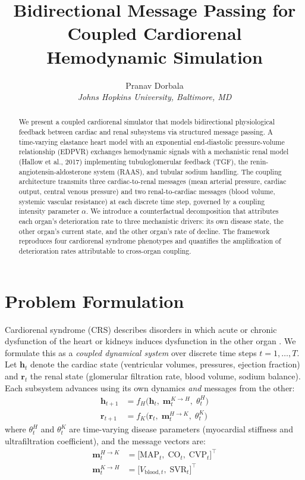 \documentclass[10pt,twocolumn]{article}
\title{\Large\bfseries Bidirectional Message Passing for Coupled Cardiorenal Hemodynamic Simulation}
\author{Pranav Dorbala\\
\normalsize\itshape Johns Hopkins University, Baltimore, MD}
\date{}
\begin{document}
\maketitle

\begin{abstract}
\noindent We present a coupled cardiorenal simulator that models bidirectional physiological feedback between cardiac and renal subsystems via structured message passing. A time-varying elastance heart model with an exponential end-diastolic pressure-volume relationship (EDPVR) exchanges hemodynamic signals with a mechanistic renal model (Hallow et al., 2017) implementing tubuloglomerular feedback (TGF), the renin-angiotensin-aldosterone system (RAAS), and tubular sodium handling. The coupling architecture transmits three cardiac-to-renal messages (mean arterial pressure, cardiac output, central venous pressure) and two renal-to-cardiac messages (blood volume, systemic vascular resistance) at each discrete time step, governed by a coupling intensity parameter $\alpha$. We introduce a counterfactual decomposition that attributes each organ's deterioration rate to three mechanistic drivers: its own disease state, the other organ's current state, and the other organ's rate of decline. The framework reproduces four cardiorenal syndrome phenotypes and quantifies the amplification of deterioration rates attributable to cross-organ coupling.
\end{abstract}

\section{Problem Formulation}
\label{sec:formulation}

Cardiorenal syndrome (CRS) describes disorders in which acute or chronic dysfunction of the heart or kidneys induces dysfunction in the other organ \citep{ronco2008}. We formulate this as a \emph{coupled dynamical system} over discrete time steps $t = 1, \dots, T$. Let $\mathbf{h}_t$ denote the cardiac state (ventricular volumes, pressures, ejection fraction) and $\mathbf{r}_t$ the renal state (glomerular filtration rate, blood volume, sodium balance). Each subsystem advances using its own dynamics \emph{and} messages from the other:
\begin{align}
\mathbf{h}_{t+1} &= f_H\!\bigl(\mathbf{h}_t,\; \mathbf{m}_{t}^{K \to H},\; \theta_t^H\bigr) \label{eq:heart}\\
\mathbf{r}_{t+1} &= f_K\!\bigl(\mathbf{r}_t,\; \mathbf{m}_{t}^{H \to K},\; \theta_t^K\bigr) \label{eq:kidney}
\end{align}
where $\theta_t^H$ and $\theta_t^K$ are time-varying disease parameters (myocardial stiffness and ultrafiltration coefficient), and the message vectors are:
\begin{align}
\mathbf{m}^{H \to K}_t &= \bigl[\text{MAP}_t,\; \text{CO}_t,\; \text{CVP}_t\bigr]^\top \label{eq:h2k}\\
\mathbf{m}^{K \to H}_t &= \bigl[V_{\text{blood},t},\; \text{SVR}_t\bigr]^\top \label{eq:k2h}
\end{align}
\end{document}
